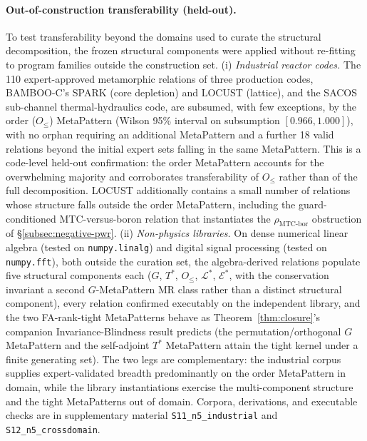 \documentclass[acmsmall,screen,review]{acmart}
\begin{document}
\paragraph{Out-of-construction transferability (held-out).} To test transferability beyond the domains used to curate the structural decomposition, the frozen structural components were applied without re-fitting to program families outside the construction set. (i) \emph{Industrial reactor codes.} The 110 expert-approved metamorphic relations of three production codes, BAMBOO-C's SPARK (core depletion) and LOCUST (lattice), and the SACOS sub-channel thermal-hydraulics code, are subsumed, with few exceptions, by the order ($O_{\le}$) MetaPattern (Wilson 95\% interval on subsumption $[0.966, 1.000]$), with no orphan requiring an additional MetaPattern and a further 18 valid relations beyond the initial expert sets falling in the same MetaPattern. This is a code-level held-out confirmation: the order MetaPattern accounts for the overwhelming majority and corroborates transferability of $O_{\le}$ rather than of the full decomposition. LOCUST additionally contains a small number of relations whose structure falls outside the order MetaPattern, including the guard-conditioned MTC-versus-boron relation that instantiates the $\rho_{\mathrm{MTC\text{-}bor}}$ obstruction of \S\ref{subsec:negative-pwr}. (ii) \emph{Non-physics libraries.} On dense numerical linear algebra (tested on \texttt{numpy.linalg}) and digital signal processing (tested on \texttt{numpy.fft}), both outside the curation set, the algebra-derived relations populate five structural components each ($G$, $T^{*}$, $O_{\le}$, $\mathcal{L}^{*}$, $\mathcal{E}^{*}$, with the conservation invariant a second $G$-MetaPattern MR class rather than a distinct structural component), every relation confirmed executably on the independent library, and the two FA-rank-tight MetaPatterns behave as Theorem~\ref{thm:closure}'s companion Invariance-Blindness result predicts (the permutation/orthogonal $G$ MetaPattern and the self-adjoint $T^{*}$ MetaPattern attain the tight kernel under a finite generating set). The two legs are complementary: the industrial corpus supplies expert-validated breadth predominantly on the order MetaPattern in domain, while the library instantiations exercise the multi-component structure and the tight MetaPatterns out of domain. Corpora, derivations, and executable checks are in supplementary material \texttt{S11\_n5\_industrial} and \texttt{S12\_n5\_crossdomain}.
\end{document}
